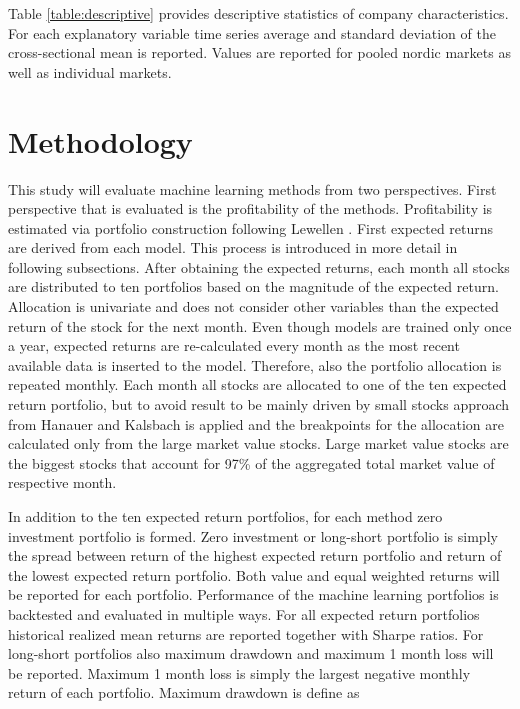 \documentclass{article}
\begin{document}
Table \ref{table:descriptive} provides descriptive statistics of company characteristics. For each explanatory variable time series average and standard deviation of the cross-sectional mean is reported. Values are reported for pooled nordic markets as well as individual markets. %



\section{Methodology} \label{Methodology}

This study will evaluate machine learning methods from two perspectives. First perspective that is evaluated is the profitability of the methods. Profitability is estimated via portfolio construction following Lewellen \citeyear{lewellen2015}. First expected returns are derived from each model. This process is introduced in more detail in following subsections. After obtaining the expected returns, each month all stocks are distributed to ten portfolios based on the magnitude of the expected return. Allocation is univariate and does not consider other variables than the expected return of the stock for the next month. Even though models are trained only once a year, expected returns are re-calculated every month as the most recent available data is inserted to the model. Therefore, also the portfolio allocation is repeated monthly. Each month all stocks are allocated to one of the ten expected return portfolio, but to avoid result to be mainly driven by small stocks approach from Hanauer and Kalsbach is applied \citeyear{HANAUER2022}  and the breakpoints for the allocation are calculated only from the large market value stocks. Large market value stocks are the biggest stocks that account for 97\% of the aggregated total market value of respective month.

In addition to the ten expected return portfolios, for each method zero investment portfolio is formed. Zero investment or long-short portfolio is simply the spread between return of the highest expected return portfolio and return of the lowest expected return portfolio. Both value and equal weighted returns will be reported for each portfolio. Performance of the machine learning portfolios is backtested and evaluated in multiple ways. For all expected return portfolios historical realized mean returns are reported together with Sharpe ratios. For long-short portfolios also maximum drawdown and maximum 1 month loss will be reported. Maximum 1 month loss is simply the largest negative monthly return of each portfolio. Maximum drawdown is define as
\end{document}
